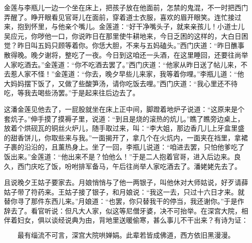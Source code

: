 金莲与李瓶儿一边一个坐在床上，把孩子放在他面前，怎禁的鬼混，不一时把西门弄醒了。睁开眼看见官哥儿在面前，穿着道士衣服，喜欢的眉开眼笑。连忙接过来，抱到怀里，与他亲个嘴儿。金莲道：“好干净嘴头子，就来亲孩儿！小道士儿吴应元，你哕他一口，你说昨日在那里使牛耕地来，今日乏困的这样的，大白日困觉？昨日叫五妈只顾等着你。你恁大胆，不来与五妈磕头。”西门庆道：“昨日醮事散得晚。晚夕谢将，整吃了一夜。今日到这咱还一头酒，在这里睡回，还要往尚举人家吃酒去。”金莲道：“你不吃酒去罢了。”西门庆道：“他家从昨日送了帖儿来，不去惹人家不怪！”金莲道：“你去，晚夕早些儿来家，我等着你哩。”李瓶儿道：“他大妈妈摆下饭了，又做了些酸笋汤，请你吃饭去哩。”西门庆道：“我心里还不待吃，等我去喝些汤罢。”于是起来往后边去了。

这潘金莲见他去了，一屁股就坐在床上正中间，脚蹬着地炉子说道：“这原来是个套炕子。”伸手摸了摸褥子里，说道：“到且是烧的滚热的炕儿。”瞧了瞧旁边桌上，放着个烘砚瓦的铜丝火炉儿，随手取过来，叫：“李大姐，那边香几儿上牙盒里盛的甜香饼儿，你取些来与我。”一面揭开了，拿几个在火炕内，一面夹在裆里，拿裙子裹的沿沿的，且薰热身上。坐了一回，李瓶儿说道：“咱进去罢，只怕他爹吃了饭出来。”金莲道：“他出来不是？怕他么！”于是二人抱着官哥，进入后边来。良久，西门庆吃了饭，吩咐排军备马，午后往尚举人家吃酒去了。潘姥姥先去了。

且说晚夕王姑子要家去。月娘悄悄与了他一两银子，叫他休对大师姑说，好歹请薛姑子带了符药来。王姑子接了银子，和月娘说：“我这一去，只过十六日才来。就替你寻了那件东西儿来。”月娘道：“也罢，你只替我干的停当，我还谢你。”于是作辞去了。看官听说：但凡大人家，似这等尼僧牙婆，决不可抬举。在深宫大院，相伴着妇女，俱以谈经说典为由，背地里送暖偷寒，甚么事儿不干出来？有诗为证：

\[
最有缁流不可言，深宫大院哄婵娟。
此辈若皆成佛道，西方依旧黑漫漫。
\]

